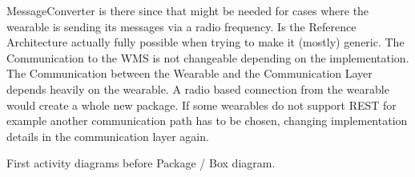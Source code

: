 \documentclass{report}
\begin{document}
MessageConverter is there since that might be needed for cases where the wearable is sending its messages via a radio frequency.
Is the Reference Architecture actually fully possible when trying to make it (mostly) generic.
The Communication to the WMS is not changeable depending on the implementation. The Communication between the Wearable and the Communication Layer depends heavily on the wearable. A radio based connection from the wearable would create a whole new package. If some wearables do not support REST for example another communication path has to be chosen, changing implementation details in the communication layer again.

First activity diagrams before Package / Box diagram.
\end{document}
